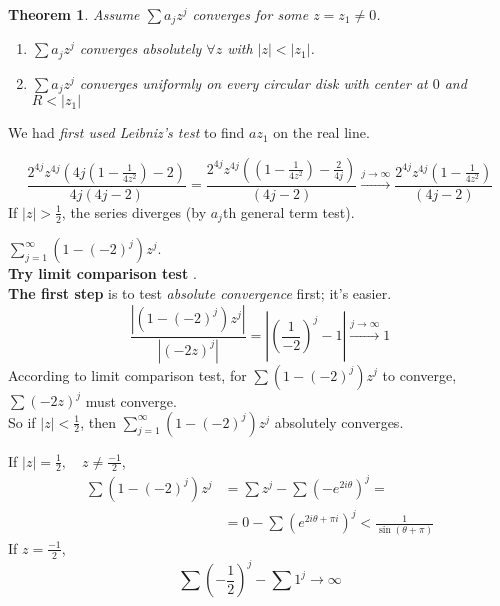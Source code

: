 \documentclass[twoside]{amsart}
\theoremstyle{plain}
\newtheorem{theorem}{Theorem}
\theoremstyle{definition}
\newcommand{\exercisehead}[1]
  {\smallskip
   \noindent{\small\bf Exercise #1.}}
\begin{document}
\begin{theorem}
  Assume $\sum a_j z^j$ converges for some $z=z_1 \neq 0 $.  \\
  \phantom{ Then } 
\begin{enumerate}
\item $\sum a_j z^j$ converges absolutely $\forall z $ with $|z| < |z_1|$.  
\item $\sum a_j z^j$ converges uniformly on every circular disk with center at $0$ and $R < |z_1|$
\end{enumerate}
\end{theorem}

We had \emph{first used Leibniz's test} to find $az_1$ on the real line.  

\[
\frac{ 2^{4j} z^{4j} (4j (1 - \frac{1}{ 4z^2 } ) - 2 ) }{ 4 j (4j-2) } = \frac{ 2^{4j} z^{4j} ((1- \frac{1}{4z^2 } ) - \frac{2}{4j } ) }{ (4j-2) }  \xrightarrow{ j \to \infty} \frac{ 2^{4j} z^{4j} (1 - \frac{1}{4z^2 } ) }{ (4j-2) }
\]
If $|z| > \frac{1}{2}$, the series diverges (by $a_j$th general term test).  

\exercisehead{5} $\sum_{j=1}^{\infty} (1 - (-2)^j )z^j $.  \\
\textbf{ Try limit comparison test }.  \\
\textbf{ The first step } is to test \emph{ absolute convergence } first; it's easier.  
\[
\frac{ \left| (1- (-2)^j ) z^j \right| }{ \left| (-2z)^j \right| } = \left| \left( \frac{1}{-2} \right)^j -1 \right| \xrightarrow{ j\to \infty} 1 
\]
According to limit comparison test, for $\sum (1-(-2)^j)z^j $ to converge, $\sum (-2z)^j$ must converge.  \\
\quad So if $|z| < \frac{1}{2}$, then $\sum_{j=1}^{\infty} (1-(-2)^j)z^j$ absolutely converges.  

If $|z| = \frac{1}{2}, \quad z \neq \frac{-1}{2}$, 
\[
\begin{aligned}
  \sum (1- (-2)^j) z^j & = \sum z^j - \sum (-e^{2i\theta} )^j = \\
  & = 0 - \sum (e^{2i\theta + \pi i })^j < \frac{1}{ \sin{ (\theta + \pi )} }
\end{aligned}
\]
If $z = \frac{-1}{2}$,
\[
\sum \left( - \frac{1}{2} \right)^j - \sum 1^j \to \infty
\]
\end{document}
